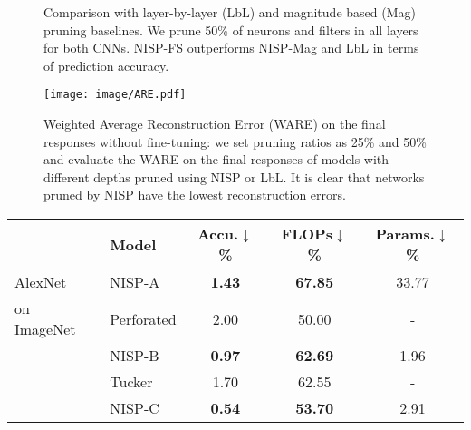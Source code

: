 \documentclass[10pt,twocolumn,letterpaper]{article}
\begin{document}
\begin{figure}[!t]
\centering    
{}
\caption{Comparison with layer-by-layer (LbL) and magnitude based (Mag) pruning baselines. We prune 50\% of neurons and filters in all layers for both CNNs. NISP-FS outperforms NISP-Mag and LbL in terms of prediction accuracy.}
\label{fig:maglbl}
\end{figure}\begin{figure}[t]
\begin{center}
   \texttt{[image: image/ARE.pdf]}
\end{center}
   \caption{Weighted Average Reconstruction Error (WARE) on the final responses without fine-tuning: we set pruning ratios as 25\% and 50\% and evaluate the WARE on the final responses of models with different depths pruned using NISP or LbL. It is clear that networks pruned by NISP have the lowest reconstruction errors.}
\label{fig:LBL}
\end{figure}\begin{table}[h]
\centering
\setlength{\tabcolsep}{4pt} 
\footnotesize
\begin{tabular}{@{}llccc@{}}
\toprule
                        & Model                           &
                        Accu.$\downarrow$\% & FLOPs$\downarrow$\% & Params.$\downarrow$\% \\ \midrule
\multirow{1}{*}{AlexNet }                 & NISP-A                          & \textbf{1.43}                          & \textbf{67.85}                         & 33.77                                        \\
\multirow{1}{*}{on ImageNet }& Perforated \cite{PerforatedCNN}         & 2.00                          & 50.00                         & -                                         \\\cmidrule{2-5}
                        & NISP-B                       & \textbf{0.97}                          & \textbf{62.69}                         & 1.96                                       \\
                        & Tucker \cite{Tucker}                & 1.70                          & 62.55                         & -                                        \\\cmidrule{2-5}
                        & NISP-C                    & \textbf{0.54}                          & \textbf{53.70}                         & 2.91                                      \\

\end{tabular}
\end{table}
\end{document}
